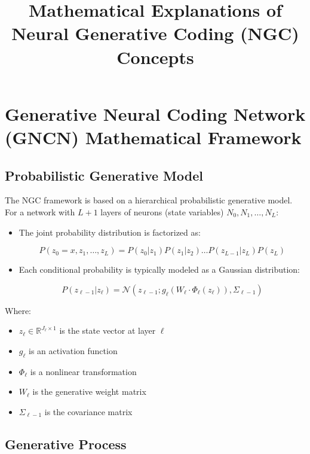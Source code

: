 \documentclass{article}
\title{Mathematical Explanations of Neural Generative Coding (NGC) Concepts}
\author{}
\date{}
\begin{document}
\maketitle

\section{Generative Neural Coding Network (GNCN) Mathematical Framework}

\subsection{Probabilistic Generative Model}

The NGC framework is based on a hierarchical probabilistic generative model. For a network with $L+1$ layers of neurons (state variables) $N_0, N_1, \ldots, N_L$:

\begin{itemize}
  \item The joint probability distribution is factorized as:
  
  \begin{equation}
    P(z_0=x, z_1, \ldots, z_L) = P(z_0|z_1)P(z_1|z_2)\ldots P(z_{L-1}|z_L)P(z_L)
  \end{equation}

  \item Each conditional probability is typically modeled as a Gaussian distribution:
  
  \begin{equation}
    P(z_{\ell-1}|z_\ell) = \mathcal{N}(z_{\ell-1}; g_\ell(W_\ell \cdot \Phi_\ell(z_\ell)), \Sigma_{\ell-1})
  \end{equation}
\end{itemize}

Where:
\begin{itemize}
  \item $z_\ell \in \mathbb{R}^{J_\ell \times 1}$ is the state vector at layer $\ell$
  \item $g_\ell$ is an activation function
  \item $\Phi_\ell$ is a nonlinear transformation
  \item $W_\ell$ is the generative weight matrix
  \item $\Sigma_{\ell-1}$ is the covariance matrix
\end{itemize}

\subsection{Generative Process}
\end{document}
